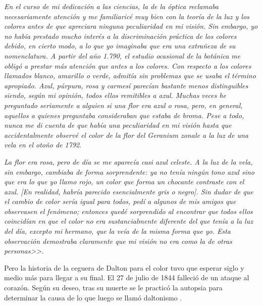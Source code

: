 \documentclass[10pt]{article}
\begin{document}
\setlength{\parskip}{2mm}

\textit{En el curso de mi dedicación a las ciencias, la de la óptica reclamaba necesariamente atención y me familiaricé muy bien con la teoría de la luz y los colores antes de que apreciara ninguna peculiaridad en mi visión. Sin embargo, yo no había prestado mucho interés a la discriminación práctica de los colores debido, en cierto modo, a lo que yo imaginaba que era una extrañeza de su nomenclatura. A partir del año 1.790, el estudio ocasional de la botánica me obligó a prestar más atención que antes a los colores. Con respecto a los colores llamados blanco, amarillo o verde, admitía sin problemas que se usaba el término apropiado. Azul, púrpura, rosa y carmesí parecían bastante menos distinguibles siendo, según mi opinión, todos ellos remitibles a azul. Muchas veces he preguntado seriamente a alguien si una flor era azul o rosa, pero, en general, aquellos a quienes preguntaba consideraban que estaba de broma. Pese a todo, nunca me di cuenta de que había una peculiaridad en mi visión hasta que accidentalmente observé el color de la flor del Geranium zonale a la luz de una vela en el otoño de 1792}.

\setlength{\parskip}{2mm}

\textit{La flor era rosa, pero de día se me aparecía casi azul celeste. A la luz de la vela, sin embargo, cambiaba de forma sorprendente: ya no tenía ningún tono azul sino que era lo que yo llamo rojo, un color que forma un chocante contraste con el azul. [En realidad, habría parecido esencialmente gris o negro]. Sin dudar de que el cambio de color sería igual para todos, pedí a algunos de mis amigos que observasen el fenómeno; entonces quedé sorprendido al encontrar que todos ellos coincidían en que el color no era sustancialmente diferente del que tenía a la luz del día, excepto mi hermano, que la veía de la misma forma que yo. Esta observación demostraba claramente que mi visión no era como la de otras personas>>}\cite{IEEEreferencias:Ref3}.

\setlength{\parskip}{2mm}

Pero la historia de la ceguera de Dalton para el color tuvo que esperar siglo y medio más para llegar a su final\cite{IEEEreferencias:Ref3}.
El 27 de julio de 1844 falleció de un ataque al corazón. Según su deseo, tras su muerte se le practicó la autopsia para determinar la causa de lo que luego se llamó daltonismo \cite{IEEEreferencias:Ref1}.

\setlength{\parskip}{2mm}
\end{document}
